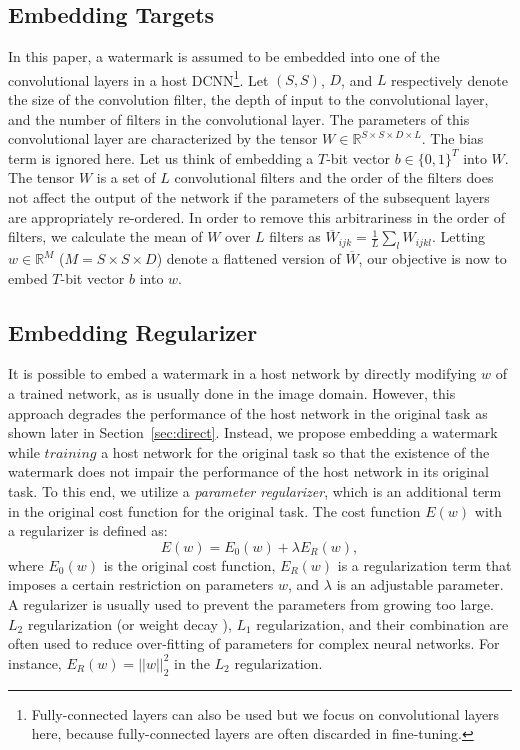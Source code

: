 \documentclass[10pt,twocolumn,letterpaper]{article}
\begin{document}
\subsection{Embedding Targets}
In this paper, a watermark is assumed to be embedded into one of the convolutional layers in a host DCNN\footnote{Fully-connected layers can also be used but we focus on convolutional layers here, because fully-connected layers are often discarded in fine-tuning.}.
Let $(S, S)$, $D$, and $L$ respectively denote the size of the convolution filter, the depth of input to the convolutional layer, and the number of filters in the convolutional layer.
The parameters of this convolutional layer are characterized by the tensor $W \in \mathbb{R}^{S \times S \times D \times L}$.
The bias term is ignored here.
Let us think of embedding a $T$-bit vector $b \in \{0, 1\}^{T}$ into $W$.
The tensor $W$ is a set of $L$ convolutional filters and the order of the filters does not affect the output of the network if the parameters of the subsequent layers are appropriately re-ordered.
In order to remove this arbitrariness in the order of filters, we calculate the mean of $W$ over $L$ filters as $\overline{W}_{ijk} = \tfrac{1}{L} \sum_l W_{ijkl}$.
Letting $w \in \mathbb{R}^M$ ($M = S \times S \times D$) denote a flattened version of $\overline{W}$, our objective is now to embed $T$-bit vector $b$ into $w$.

\subsection{Embedding Regularizer}
\label{sec:regularizer}
It is possible to embed a watermark in a host network by directly modifying $w$ of a trained network, as is usually done in the image domain.
However, this approach degrades the performance of the host network in the original task as shown later in Section~\ref{sec:direct}.
Instead, we propose embedding a watermark while $training$ a host network for the original task so that the existence of the watermark does not impair the performance of the host network in its original task.
To this end, we utilize a \textit{parameter regularizer}, which is an additional term in the original cost function for the original task.
The cost function $E(w)$ with a regularizer is defined as:
\begin{equation}
\label{eq:param}
E(w) = E_0 (w) + \lambda E_R (w),
\end{equation}
where $E_0 (w)$ is the original cost function, $E_R (w)$ is a regularization term that imposes a certain restriction on parameters $w$, and $\lambda$ is an adjustable parameter.
A regularizer is usually used to prevent the parameters from growing too large.
$L_2$ regularization (or weight decay \cite{kro_nips92}), $L_1$ regularization, and their combination are often used to reduce over-fitting of parameters for complex neural networks.
For instance, $E_R (w) = ||w||^2_2$ in the $L_2$ regularization.
\end{document}
